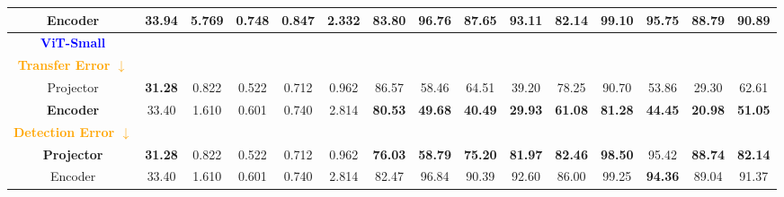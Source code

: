 \begin{table*}[ht]
{\begin{tabular}{cc|cccc|ccccccccc}
    Encoder & 33.94 & 5.769 & 0.748 & 0.847 & 2.332 & 83.80 & 96.76 & 87.65 & 93.11 & 82.14 & 99.10 & 95.75 & \textbf{88.79} & 90.89 \\
    \hline \hline
    \textcolor{blue}{\textbf{ViT-Small}} \\
    \textcolor{orange}{\textbf{Transfer Error $\downarrow$}} \\
    
    Projector & \textbf{31.28} & 0.822 & 0.522 & 0.712 & 0.962 & 86.57 & 58.46 & 64.51 & 39.20 & 78.25 & 90.70 & 53.86 & 29.30 & 62.61 \\
    
    \rowcolor[gray]{0.9}
    \textbf{Encoder} & 33.40 & 1.610 & 0.601 & 0.740 & 2.814 & \textbf{80.53} & \textbf{49.68} & \textbf{40.49} & \textbf{29.93} & \textbf{61.08} & \textbf{81.28} & \textbf{44.45} & \textbf{20.98} & \textbf{51.05} \\
    \hline
    
    \textcolor{orange}{\textbf{Detection Error $\downarrow$}} \\
    \rowcolor[gray]{0.9}
    \textbf{Projector} & \textbf{31.28} & 0.822 & 0.522 & 0.712 & 0.962 & \textbf{76.03} & \textbf{58.79} & \textbf{75.20} & \textbf{81.97} & \textbf{82.46} & \textbf{98.50} & 95.42 & \textbf{88.74} & \textbf{82.14} \\
    
    Encoder & 33.40 & 1.610 & 0.601 & 0.740 & 2.814 & 82.47 & 96.84 & 90.39 & 92.60 & 86.00 & 99.25 & \textbf{94.36} & 89.04 & 91.37 \\
    
    \bottomrule
    \end{tabular}}
\end{table*}